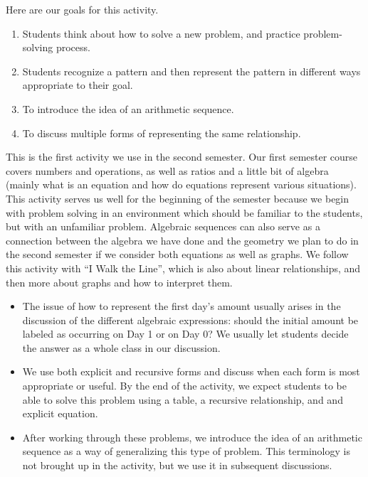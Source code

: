 \documentclass[nooutcomes]{ximera}
\begin{document}
\begin{instructorNotes}
Here are our goals for this activity.
\begin{enumerate}
\item Students think about how to solve a new problem, and practice problem-solving process.
\item  Students recognize a pattern and then represent the pattern in different ways appropriate to their goal.
\item  To introduce the idea of an arithmetic sequence.
\item To discuss multiple forms of representing the same relationship. 
\end{enumerate}

This is the first activity we use in the second semester.  Our first semester course covers numbers and operations, as well as ratios and a little bit of algebra (mainly what is an equation and how do equations represent various situations).  This activity serves us well for the beginning of the semester because we begin with problem solving in an environment which should be familiar to the students, but with an unfamiliar problem.  Algebraic sequences can also serve as a connection between the algebra we have done and the geometry we plan to do in the second semester if we consider both equations as well as graphs.  We follow this activity with ``I Walk the Line'', which is also about linear relationships, and then more about graphs and how to interpret them. 

\begin{itemize}
\item The issue of how to represent the first day's amount usually arises in the discussion of the different algebraic expressions:  should the initial amount be labeled as occurring on Day 1 or on Day 0? We usually let students decide the answer as a whole class in our discussion.
\item We use both explicit and recursive forms and discuss when each form is most appropriate or useful.  By the end of the activity, we expect students to be able to solve this problem using a table, a recursive relationship, and and explicit equation.
\item After working through these problems, we introduce the idea of an arithmetic sequence as a way of generalizing this type of problem.  This terminology is not brought up in the activity, but we use it in subsequent discussions.
\end{itemize}

\end{instructorNotes}
\end{document}
